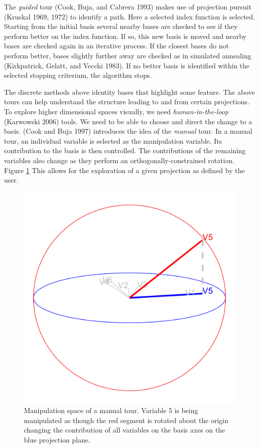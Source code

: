 \documentclass[11,]{article}
\begin{document}
The \emph{guided} tour (Cook, Buja, and Cabrera 1993) makes use of projection pursuit (Kruskal 1969, 1972) to identify a path. Here a selected index function is selected. Starting from the initial basis several nearby bases are checked to see if they perform better on the index function. If so, this new basis is moved and nearby bases are checked again in an iterative process. If the closest bases do not perform better, bases slightly further away are checked as in simulated annealing (Kirkpatrick, Gelatt, and Vecchi 1983). If no better basis is identified within the selected stopping criterium, the algorithm stops.

The discrete methods above identity bases that highlight some feature. The above tours can help understand the structure leading to and from certain projections. To explore higher dimensional spaces visually, we need \emph{human-in-the-loop} (Karwowski 2006) tools. We need to be able to choose and direct the change to a basis. (Cook and Buja 1997) introduces the idea of the \emph{manual} tour. In a manual tour, an individual variable is selected as the manipulation variable. Its contribution to the basis is then controlled. The contributions of the remaining variables also change as they perform an orthogonally-constrained rotation. Figure \ref{fig:manipSpace} This allows for the exploration of a given projection as defined by the user.

\begin{figure}

{\centering \includegraphics[width=0.5\linewidth]{figures/manip_space} 

}

\caption{Manipulation space of a manual tour. Variable 5 is being manipulated as though the red segment is rotated about the origin changing the contribution of all variables on the basis axes on the blue projection plane.}\label{fig:manipSpace}
\end{figure}
\end{document}
